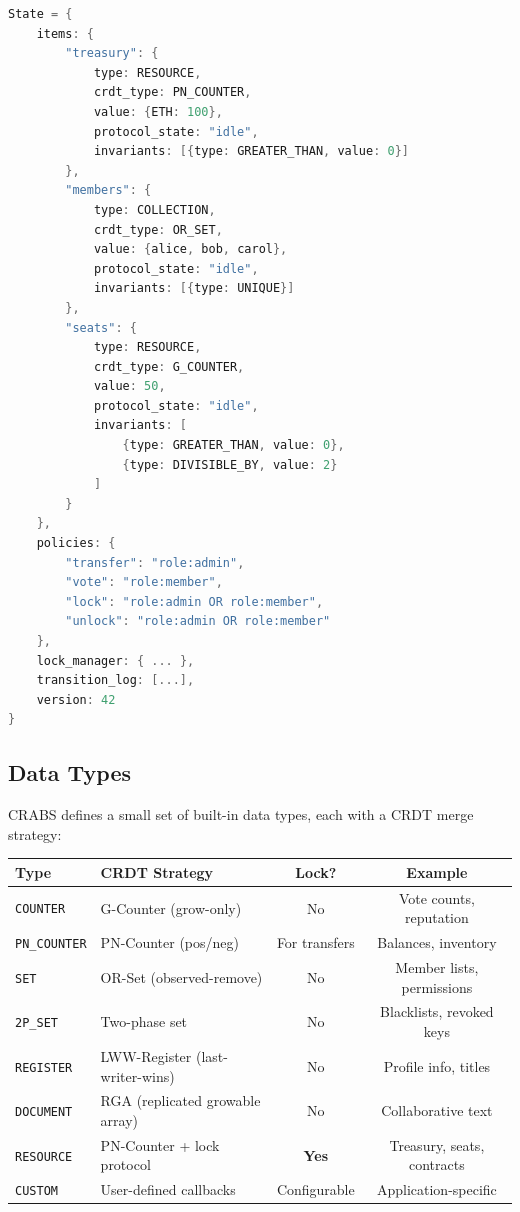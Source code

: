 \documentclass[sigconf,nonacm]{acmart}
\newcommand{\crab}{\textsc{CRABS}}
\begin{document}
\begin{lstlisting}[language=C]
State = {
    items: {
        "treasury": {
            type: RESOURCE,
            crdt_type: PN_COUNTER,
            value: {ETH: 100},
            protocol_state: "idle",
            invariants: [{type: GREATER_THAN, value: 0}]
        },
        "members": {
            type: COLLECTION,
            crdt_type: OR_SET,
            value: {alice, bob, carol},
            protocol_state: "idle",
            invariants: [{type: UNIQUE}]
        },
        "seats": {
            type: RESOURCE,
            crdt_type: G_COUNTER,
            value: 50,
            protocol_state: "idle",
            invariants: [
                {type: GREATER_THAN, value: 0},
                {type: DIVISIBLE_BY, value: 2}
            ]
        }
    },
    policies: {
        "transfer": "role:admin",
        "vote": "role:member",
        "lock": "role:admin OR role:member",
        "unlock": "role:admin OR role:member"
    },
    lock_manager: { ... },
    transition_log: [...],
    version: 42
}
\end{lstlisting}

\subsection{Data Types}

\crab{} defines a small set of built-in data types, each with a CRDT merge strategy:

\vspace{4pt}
\begin{tabularx}{\columnwidth}{lXcc}
\toprule
\textbf{Type} & \textbf{CRDT Strategy} & \textbf{Lock?} & \textbf{Example} \\
\midrule
\texttt{COUNTER} & G-Counter (grow-only) & No & Vote counts, reputation \\
\texttt{PN\_COUNTER} & PN-Counter (pos/neg) & For transfers & Balances, inventory \\
\texttt{SET} & OR-Set (observed-remove) & No & Member lists, permissions \\
\texttt{2P\_SET} & Two-phase set & No & Blacklists, revoked keys \\
\texttt{REGISTER} & LWW-Register (last-writer-wins) & No & Profile info, titles \\
\texttt{DOCUMENT} & RGA (replicated growable array) & No & Collaborative text \\
\texttt{RESOURCE} & PN-Counter + lock protocol & \textbf{Yes} & Treasury, seats, contracts \\
\texttt{CUSTOM} & User-defined callbacks & Configurable & Application-specific \\
\bottomrule
\end{tabularx}
\end{document}
